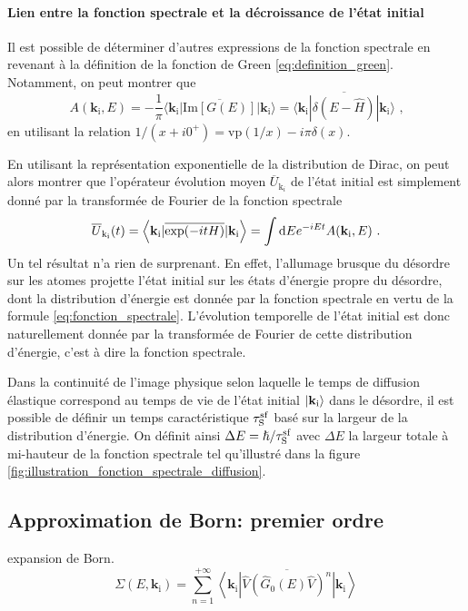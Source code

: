 \paragraph*{Lien entre la fonction spectrale et la décroissance de l'état initial}
Il est possible de déterminer d'autres expressions de la fonction spectrale en revenant à la définition de la fonction de Green \ref{eq:definition_green}. Notamment, on peut montrer que
\begin{equation}
A(\mathbf{k}_{\mathrm{i}},E)=-\frac{1}{\pi} \overline{\langle \mathbf{k}_{\mathrm{i}} | \mathrm{Im}\left[G(E)\right]| \mathbf{k}_{\mathrm{i}} \rangle} = \overline{\langle \mathbf{k}_{\mathrm{i}} | \delta(E-\hat{H})|\mathbf{k}_{\mathrm{i}}\rangle} \text{ ,}
\end{equation}
en utilisant la relation $ 1/(x+i0^+)=\mathrm{vp}(1/x)-i\pi \delta(x)$. 

En utilisant la représentation exponentielle de la distribution de Dirac, on peut alors montrer que l'opérateur évolution moyen $\overline{U}_{\mathrm{k}_i}$ de l'état initial est simplement donné par la transformée de Fourier de la fonction spectrale
\begin{equation}
\overline{U}_{\mathrm{k}_{\mathrm{i}}}(t)=\left\langle \mathbf{k}_{\mathrm{i}} | \overline{\exp(-itH)}  | \mathbf{k}_{\mathrm{i}} \right\rangle = \int{\mathop{}\mathopen{}\mathrm{d}E e^{-iEt} A(\mathbf{k}_{\mathrm{i}},E)} \text{ .}
\end{equation}
Un tel résultat n'a rien de surprenant. En effet, l'allumage brusque du désordre sur les atomes projette l'état initial sur les états d'énergie propre du désordre, dont la distribution d'énergie est donnée par la fonction spectrale en vertu de la formule \ref{eq:fonction_spectrale}. L'évolution temporelle de l'état initial est donc naturellement donnée par la transformée de Fourier de cette distribution d'énergie, c'est à dire la fonction spectrale. 

Dans la continuité de l'image physique selon laquelle le temps de diffusion élastique correspond au temps de vie de l'état initial $\left| \mathbf{k}_{\mathrm{i}} \right\rangle$ dans le désordre, il est possible de définir un temps caractéristique $\tau_{\mathrm{S}}^{\mathrm{sf}}$ basé sur la largeur de la distribution d'énergie. On définit ainsi $\Delta E = \hslash/\tau_{\mathrm{S}}^{\mathrm{sf}}$ avec $\Delta E$ la largeur totale à mi-hauteur de la fonction spectrale tel qu'illustré dans la figure \ref{fig:illustration_fonction_spectrale_diffusion}. 

\subsection{Approximation de Born: premier ordre}
expansion de Born.
\begin{equation}
\Sigma(E,\mathbf{k}_{\mathrm{i}}) = \sum_{n=1}^{+\infty}{\overline{\left\langle \mathbf{k}_{\mathrm{i}}\left| \hat{V} \left(\hat{G}_0(E) \hat{V}\right)^n \right|\mathbf{k}_{\mathrm{i}}\right\rangle}}
\end{equation}


